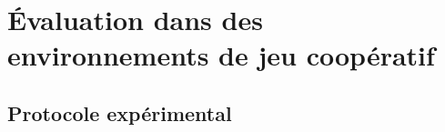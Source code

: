 \documentclass[contribution]{jfsma}
\begin{document}




\section{Évaluation dans des environnements de jeu coopératif}


\subsection{Protocole expérimental}
\end{document}
